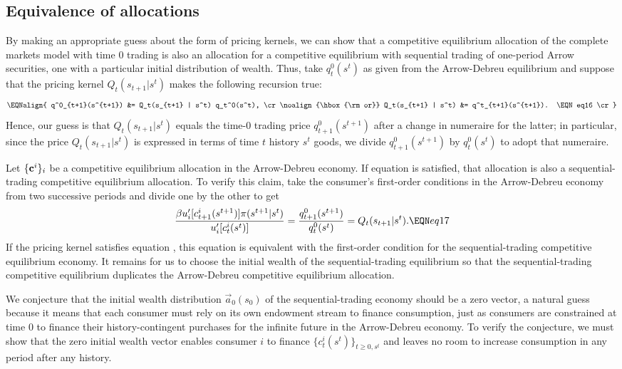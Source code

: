 \subsection{Equivalence of allocations}
By making an appropriate guess about the form of  pricing
kernels, we can show that a competitive equilibrium
allocation of the complete markets model with time $0$ trading is
also an allocation for a competitive equilibrium with sequential trading of one-period
Arrow securities, one
with a particular initial distribution of wealth.  Thus, take
$q_t^0(s^t)$ as given from the Arrow-Debreu equilibrium and
suppose that the pricing kernel $Q_t(s_{t+1} | s^t)$ makes
the following recursion true:
$$\EQNalign{
 q^0_{t+1}(s^{t+1}) &= Q_t(s_{t+1} | s^t) q_t^0(s^t), \cr
\noalign{\hbox{\rm or}}
 Q_t(s_{t+1} | s^t) &= q^t_{t+1}(s^{t+1}).       \EQN eq16 \cr}
$$
Hence, our guess is 
that $Q_t(s_{t+1} | s^t)$ equals
the time-0 trading price $q^0_{t+1}(s^{t+1})$ after
a change in numeraire for the latter; in particular, 
since the price $Q_t(s_{t+1} | s^t)$ 
is expressed in terms of time $t$ history $s^t$ goods,
we divide $q^0_{t+1}(s^{t+1})$ by $q_t^0(s^t)$ to
adopt that  numeraire. 

Let
$\{{\bf c}^i \}_i$ be a competitive equilibrium allocation
in the Arrow-Debreu economy.
If equation  is satisfied, that allocation is also a
sequential-trading competitive equilibrium allocation.  To verify this claim,
take the consumer's first-order conditions  in the Arrow-Debreu
economy from two successive periods and divide one by
the other to get
$$ {\beta u'_i[c_{t+1}^i(s^{t+1})] \pi(s^{t+1} | s^t) \over
       u'_i[c_t^i(s^t)]} = {q^0_{t+1}(s^{t+1}) \over q_t^0(s^t) }
   = Q_t(s_{t+1}\vert s^t).  \EQN eq17 $$
If the pricing kernel satisfies equation , this equation
is equivalent with the first-order condition  for the sequential-trading
competitive equilibrium economy. It remains for us
to choose the initial wealth of the sequential-trading equilibrium so
that the sequential-trading competitive equilibrium duplicates the
Arrow-Debreu competitive equilibrium allocation.


We conjecture that the initial wealth distribution
$\vec { a}_0(s_0)$ of the sequential-trading economy should be a zero vector, a natural guess because
it means that each consumer must rely on its own
endowment stream to finance consumption, just as consumers are
constrained at time $0$ to finance their history-contingent purchases
for the infinite future  in the Arrow-Debreu economy.
To  verify  the conjecture, we must show that the zero
initial wealth vector enables consumer $i$ to finance $\{c^i_t(s^t)\}_{t \geq 0, s^t}$
and leaves no room to increase consumption in any period
 after any history.


